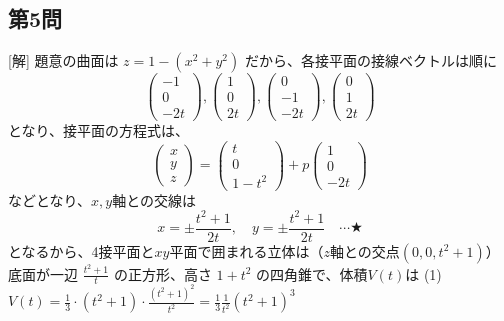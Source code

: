 \documentclass[../main.tex]{subfiles}
\begin{document}
\subsection*{第5問}
[解] 題意の曲面は $z = 1 - (x^2 + y^2)$ だから、各接平面の接線ベクトルは順に
\begin{equation*}
  \begin{pmatrix} -1 \\ 0 \\ -2t
  \end{pmatrix},
  \begin{pmatrix} 1 \\ 0 \\ 2t
  \end{pmatrix},
  \begin{pmatrix} 0 \\ -1 \\ -2t
  \end{pmatrix},
  \begin{pmatrix} 0 \\ 1 \\ 2t
  \end{pmatrix}
\end{equation*}
となり、接平面の方程式は、
\begin{equation*}
  \begin{pmatrix} x \\ y \\ z
  \end{pmatrix} =
  \begin{pmatrix} t \\ 0 \\ 1-t^2
  \end{pmatrix} + p
  \begin{pmatrix} 1 \\ 0 \\ -2t
  \end{pmatrix}
\end{equation*}
などとなり、$x, y$軸との交線は
\begin{equation*}
  x = \pm\frac{t^2+1}{2t}, \quad y = \pm\frac{t^2+1}{2t} \quad \cdots \text{★}
\end{equation*}
となるから、4接平面と$xy$平面で囲まれる立体は（$z$軸との交点$(0, 0, t^2+1)$）
底面が一辺 $\frac{t^2+1}{t}$ の正方形、高さ $1+t^2$ の四角錐で、体積$V(t)$は
(1) $V(t) = \frac{1}{3} \cdot (t^2+1) \cdot \frac{(t^2+1)^2}{t^2} = \frac{1}{3} \frac{1}{t^2} (t^2+1)^3$
\end{document}
